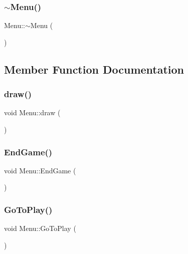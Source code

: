 \mbox{\label{class_menu_a831387f51358cfb88cd018e1777bc980}} 
\subsubsection{\texorpdfstring{$\sim$Menu()}{~Menu()}}
{\footnotesize\ttfamily Menu\+::$\sim$\+Menu (\begin{DoxyParamCaption}{ }\end{DoxyParamCaption})}



\subsection{Member Function Documentation}
\mbox{\label{class_menu_a2cd7ab9901a8f42a3ae977d0774398a6}} 
\subsubsection{\texorpdfstring{draw()}{draw()}}
{\footnotesize\ttfamily void Menu\+::draw (\begin{DoxyParamCaption}{ }\end{DoxyParamCaption})}

\mbox{\label{class_menu_a2e8171f80079f9ddba6569934d8082fb}} 
\subsubsection{\texorpdfstring{EndGame()}{EndGame()}}
{\footnotesize\ttfamily void Menu\+::\+End\+Game (\begin{DoxyParamCaption}{ }\end{DoxyParamCaption})}

\mbox{\label{class_menu_a9a1d32a0de02d53920ba66892903a835}} 
\subsubsection{\texorpdfstring{GoToPlay()}{GoToPlay()}}
{\footnotesize\ttfamily void Menu\+::\+Go\+To\+Play (\begin{DoxyParamCaption}{ }\end{DoxyParamCaption})}

